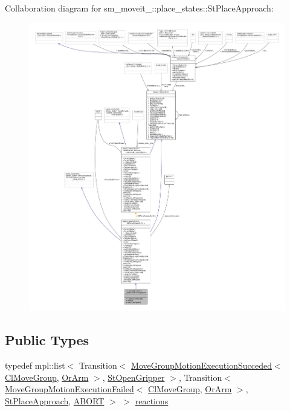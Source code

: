 Collaboration diagram for sm\+\_\+moveit\+\_\+:\+:place\+\_\+states\+:\+:St\+Place\+Approach\+:
\nopagebreak
\begin{figure}[H]
\begin{center}
\leavevmode
\includegraphics[width=350pt]{structsm__moveit__3_1_1place__states_1_1StPlaceApproach__coll__graph}
\end{center}
\end{figure}
\subsection*{Public Types}
\begin{DoxyCompactItemize}
\item 
typedef mpl\+::list$<$ Transition$<$ \hyperlink{structmove__group__interface__client_1_1MoveGroupMotionExecutionSucceded}{Move\+Group\+Motion\+Execution\+Succeded}$<$ \hyperlink{classmove__group__interface__client_1_1ClMoveGroup}{Cl\+Move\+Group}, \hyperlink{classsm__moveit__3_1_1OrArm}{Or\+Arm} $>$, \hyperlink{structsm__moveit__3_1_1place__states_1_1StOpenGripper}{St\+Open\+Gripper} $>$, Transition$<$ \hyperlink{structmove__group__interface__client_1_1MoveGroupMotionExecutionFailed}{Move\+Group\+Motion\+Execution\+Failed}$<$ \hyperlink{classmove__group__interface__client_1_1ClMoveGroup}{Cl\+Move\+Group}, \hyperlink{classsm__moveit__3_1_1OrArm}{Or\+Arm} $>$, \hyperlink{structsm__moveit__3_1_1place__states_1_1StPlaceApproach}{St\+Place\+Approach}, \hyperlink{classABORT}{A\+B\+O\+RT} $>$ $>$ \hyperlink{structsm__moveit__3_1_1place__states_1_1StPlaceApproach_ae2448d9da357985f7a96a58bc4bea1e2}{reactions}
\end{DoxyCompactItemize}
